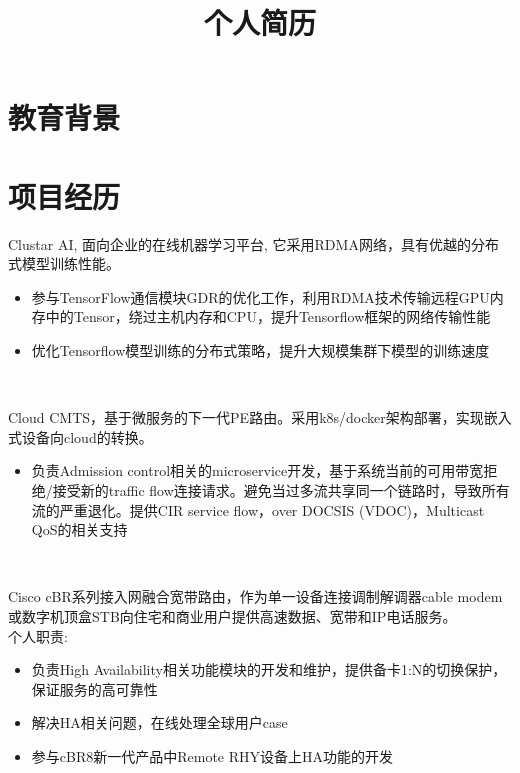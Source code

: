 \documentclass[11pt,a4paper]{moderncv}
\title{个人简历}                      %
\begin{document}
\maketitle
\renewcommand{\baselinestretch}{1}

\section{教育背景}


\section{项目经历}
\renewcommand{\baselinestretch}{1}
{Clustar\,\,AI, 面向企业的在线机器学习平台, 它采用RDMA网络，具有优越的分布式模型训练性能。
\begin{itemize}
\item 参与TensorFlow通信模块GDR的优化工作，利用RDMA技术传输远程GPU内存中的Tensor，绕过主机内存和CPU，提升Tensorflow框架的网络传输性能
\item 优化Tensorflow模型训练的分布式策略，提升大规模集群下模型的训练速度
\end{itemize}}
\\
{Cloud\,\,CMTS，基于微服务的下一代PE路由。采用k8s/docker架构部署，实现嵌入式设备向cloud的转换。
\begin{itemize}
\item 负责Admission control相关的microservice开发，基于系统当前的可用带宽拒绝/接受新的traffic flow连接请求。避免当过多流共享同一个链路时，导致所有流的严重退化。提供CIR service flow，over DOCSIS (VDOC)，Multicast QoS的相关支持
\end{itemize}}
\\
{Cisco cBR系列接入网融合宽带路由，作为单一设备连接调制解调器cable modem或数字机顶盒STB向住宅和商业用户提供高速数据、宽带和IP电话服务。\\
个人职责:
\begin{itemize}
\item 负责High\,\,Availability相关功能模块的开发和维护，提供备卡1:N的切换保护，保证服务的高可靠性
\item 解决HA相关问题，在线处理全球用户case
\item 参与cBR8新一代产品中Remote RHY设备上HA功能的开发
\end{itemize}}
\end{document}
